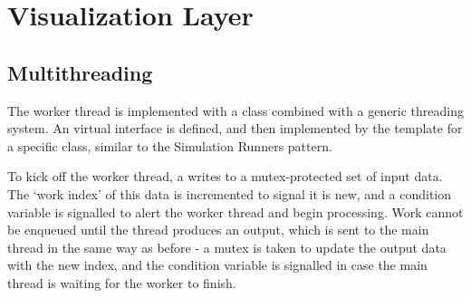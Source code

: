 \section{Visualization Layer}\label{sec:ImplementationViz}
\subsection{Multithreading}
The worker thread is implemented with a  class combined with a generic threading system.
An  virtual interface is defined, and then implemented by the  template for a specific  class, similar to the Simulation Runners pattern.

To kick off the worker thread, a  writes to a mutex-protected set of input data.
The `work index' of this data is incremented to signal it is new, and a condition variable is signalled to alert the worker thread and begin processing.
Work cannot be enqueued until the thread produces an output, which is sent to the main thread in the same way as before - a mutex is taken to update the output data with the new index, and the condition variable is signalled in case the main thread is waiting for the worker to finish.


